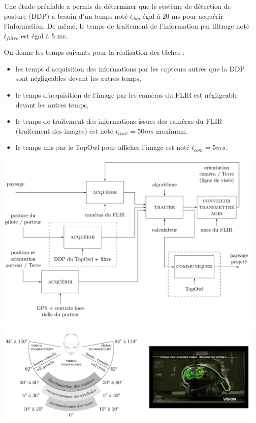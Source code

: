 Une étude préalable a permis de déterminer que le système de détection de posture (DDP) a besoin d'un temps noté $t_{ddp}$ égal à 20 ms pour acquérir l'information. De même, le temps de traitement de l'information par filtrage noté $t_{filtre}$ est égal à 5 ms.

On donne les temps suivants pour la réalisation des tâches :
\begin{itemize}
 \item les temps d'acquisition des informations par les capteurs autres que la DDP sont négligeables devant les autres temps,
 \item le temps d'acquisition de l'image par les caméras du FLIR est négligeable devant les autres temps,
 \item le temps de traitement des informations issues des caméras du FLIR (traitement des images) est noté $t_{trait}=50ms$ maximum,
 \item le temps mis par le TopOwl pour afficher l'image est noté $t_{com}=5ms$.
\end{itemize}

\begin{center}
\includegraphics[width=0.7\linewidth]{img/fig05}
\end{center}


\begin{center}
\includegraphics[width=0.7\linewidth]{img/fig06}
\end{center}

